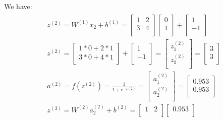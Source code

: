 \documentclass[leqno]{article}
\begin{document}
We have: 
\begin{gather*}
\begin{split}
&z^{(2)} = W^{(1)}x_2 + b^{(1)} =
  \begin{bmatrix}
  1 & 2\\
  3 & 4\\ 
  \end{bmatrix}
  \begin{bmatrix}
  0\\
  1\\ 
  \end{bmatrix}
  +
 \begin{bmatrix}
  1\\
  -1\\ 
  \end{bmatrix}
\\
&z^{(2)} = 
  \begin{bmatrix}
  1*0 + 2*1\\
  3*0 + 4*1\\ 
  \end{bmatrix}
  +
 \begin{bmatrix}
  1\\
  -1\\ 
  \end{bmatrix}
=
 \begin{bmatrix}
  z_1^{(2)}\\
  z_2^{(2)}\\ 
  \end{bmatrix}
=
 \begin{bmatrix}
  3\\
  3\\ 
  \end{bmatrix}
\\
&a^{(2)} = f(z^{(2)}) = \frac{1}{1 + e^{-z{(2)}}} =
 \begin{bmatrix}
   a_1^{(2)}\\
   a_2^{(2)}\\ 
  \end{bmatrix}
=
 \begin{bmatrix}
   0.953\\
   0.953\\ 
  \end{bmatrix}
\\
&z^{(3)} = W^{(2)}a_2^{(2)} + b^{(2)} =
 \begin{bmatrix}
   1 & 2\\
  \end{bmatrix}
 \begin{bmatrix}
   0.953\\

\end{bmatrix}
\end{split}
\end{gather*}
\end{document}
